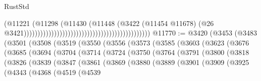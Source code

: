\begin{lexlean}{RustStd}
\begin{coremodule}
                                                                                    (@11221
                                                                                      (@11298
                                                                                        (@11430
                                                                                          (@11448
                                                                                            (@3422
                                                                                              (@11454
                                                                                                @11678)
                                                                                              (@26
                                                                                                @3421))))))))))))))))))))))))))))))))))))))))))))))
@11770 := @3420
    (@3453
      (@3483
        (@3501
          (@3508
            (@3519
              (@3550
                (@3556
                  (@3573
                    (@3585
                      (@3603
                        (@3623
                          (@3676
                            (@3685
                              (@3694
                                (@3704
                                  (@3714
                                    (@3724
                                      (@3750
                                        (@3764
                                          (@3791
                                            (@3800
                                              (@3818
                                                (@3826
                                                  (@3839
                                                    (@3847
                                                      (@3861
                                                        (@3869
                                                          (@3880
                                                            (@3889
                                                              (@3901
                                                                (@3909
                                                                  (@3925
                                                                    (@4343
                                                                      (@4368
                                                                        (@4519
                                                                          (@4539

\end{coremodule}
\end{lexlean}
